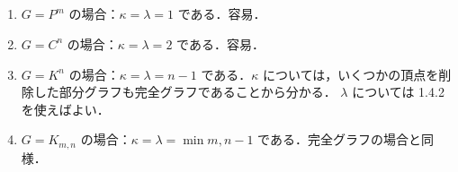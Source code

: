 \subsection{}
\begin{enumerate}
 \item $G = P^m$ の場合：$\kappa = \lambda = 1$ である．容易．
 \item $G = C^n$ の場合：$\kappa = \lambda = 2$ である．容易．
 \item $G = K^n$ の場合：$\kappa = \lambda = n-1$ である．$\kappa$ については，いくつかの頂点を削除した部分グラフも完全グラフであることから分かる．
 $\lambda$ については 1.4.2 を使えばよい．
 \item $G = K_{m,n}$ の場合：$\kappa = \lambda = \min{m,n}-1$ である．完全グラフの場合と同様．
\end{enumerate}